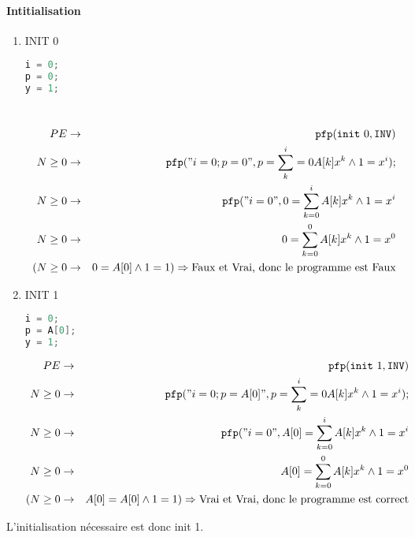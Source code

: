 \paragraph{Intitialisation}
\begin{enumerate} 
	\item INIT 0 \begin{lstlisting}[language=C,numbers=none]
i = 0; 
p = 0; 
y = 1;
\end{lstlisting}~
\begin{eqnarray*}
PE &\rightarrow& \texttt{pfp} (\texttt{init}\ 0, \texttt{INV})\\
N \geq 0 &\rightarrow& \texttt{pfp} ("i=0;p=0", p=\sum^i_k=0 A[k]x^k \wedge 1 = x^i);\\
N \geq 0 &\rightarrow& \texttt{pfp} ("i=0", 0 = \sum^i_{k=0} A[k]x^k \wedge 1 = x^i\\
N \geq 0 &\rightarrow& 0 = \sum^0_{k=0} A[k]x^k \wedge 1 = x^0\\
(N \geq 0 &\rightarrow& 0 = A[0] \wedge 1 = 1) \Rightarrow \textrm{Faux et Vrai, donc le programme est Faux} \end{eqnarray*}
	\item INIT 1 \begin{lstlisting}[language=C,numbers=none]
i = 0; 
p = A[0]; 
y = 1;
\end{lstlisting}
\begin{eqnarray*}
PE &\rightarrow& \texttt{pfp} (\texttt{init}\ 1, \texttt{INV})\\
N \geq 0 &\rightarrow& \texttt{pfp} ("i=0;p=A[0]", p=\sum^i_k=0 A[k]x^k \wedge 1 = x^i);\\
N \geq 0 &\rightarrow& \texttt{pfp} ("i=0", A[0] = \sum^i_{k=0} A[k]x^k \wedge 1 = x^i\\
N \geq 0 &\rightarrow& A[0] = \sum^0_{k=0} A[k]x^k \wedge 1 = x^0\\
(N \geq 0 &\rightarrow& A[0] = A[0] \wedge 1 = 1) \Rightarrow \textrm{Vrai et Vrai, donc le programme est correct}
\end{eqnarray*}
\end{enumerate}
L'initialisation nécessaire est donc init 1.
